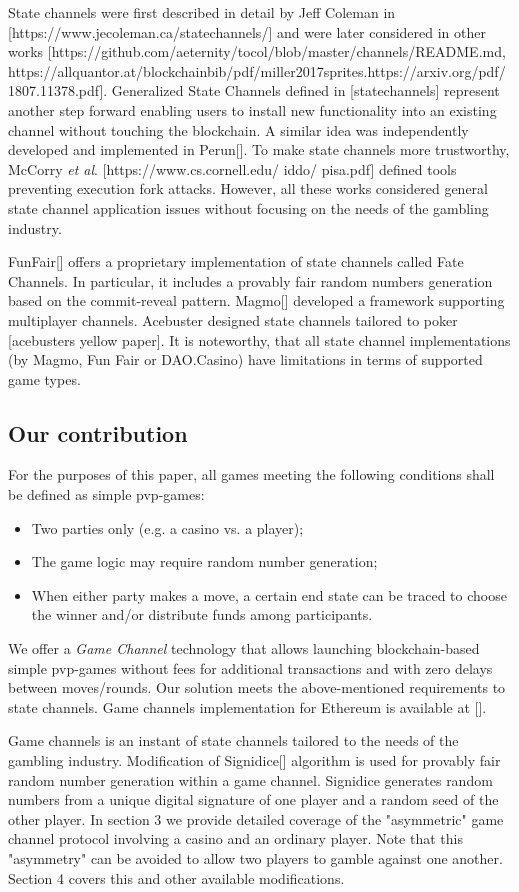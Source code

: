 	State channels were first described in detail by Jeff Coleman in [https://www.jecoleman.ca/statechannels/] and were later considered in other works [https://github.com/aeternity/tocol/blob/master/channels/README.md, https://allquantor.at/blockchainbib/pdf/miller2017sprites.https://arxiv.org/pdf/1807.11378.pdf]. Generalized State Channels defined in [statechannels] represent another step forward enabling users to install new functionality into an existing channel without touching the blockchain. A similar idea was independently developed and implemented in Perun[]. To make state channels more trustworthy, McCorry \textit {et al}. [https://www.cs.cornell.edu/ iddo/ pisa.pdf] defined tools preventing execution fork attacks. However, all these works considered general state channel application issues without focusing on the needs of the gambling industry.

	FunFair[] offers a proprietary implementation of state channels called Fate Channels. In particular, it includes a provably fair random numbers generation based on the commit-reveal pattern. Magmo[] developed a framework supporting multiplayer channels. Acebuster designed  state channels tailored to poker [acebusters yellow paper]. It is noteworthy, that all state channel implementations (by Magmo, Fun Fair or DAO.Casino) have limitations in terms of supported game types.

		\subsection {Our contribution}
	For the purposes of this paper, all games meeting the following conditions shall be defined as simple pvp-games:
	\begin{itemize}
		\item Two parties only (e.g. a casino vs. a player);
		\item The game logic may require random number generation;
		\item When either party makes a move, a certain end state can be traced to choose the winner and/or distribute funds among participants.
	\end{itemize}
	We offer a \textit {Game Channel} technology that allows launching blockchain-based simple pvp-games without fees for additional transactions and with zero delays between moves/rounds. Our solution meets the above-mentioned requirements to state channels. Game channels implementation for Ethereum is available at [].

	Game channels is an instant of state channels tailored to the needs of the gambling industry. Modification of Signidice[]
algorithm is used for provably fair random number generation within a game channel. Signidice generates random numbers from a unique digital signature of one player and a random seed of the other player. In section 3 we provide detailed coverage of the "asymmetric" game channel protocol involving a casino and an ordinary player. Note that this "asymmetry" can be avoided to allow two players to gamble against one another. Section 4 covers this and other available modifications.